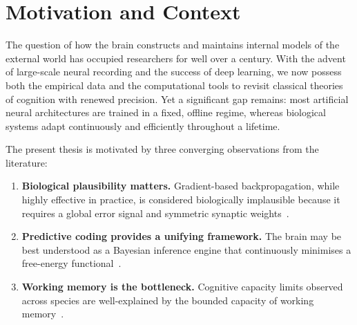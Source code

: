 \section{Motivation and Context}

The question of how the brain constructs and maintains internal models of the external
world has occupied researchers for well over a century.  With the advent of large-scale
neural recording and the success of deep learning, we now possess both the empirical
data and the computational tools to revisit classical theories of cognition with renewed
precision.  Yet a significant gap remains: most artificial neural architectures are
trained in a fixed, offline regime, whereas biological systems adapt continuously and
efficiently throughout a lifetime.

\medskip
The present thesis is motivated by three converging observations from the literature:
\begin{enumerate}
  \item \textbf{Biological plausibility matters.} Gradient-based backpropagation, while
        highly effective in practice, is considered biologically implausible because it
        requires a global error signal and symmetric synaptic weights~\cite{crick1989}.
  \item \textbf{Predictive coding provides a unifying framework.} The brain may be best
        understood as a Bayesian inference engine that continuously minimises a free-energy
        functional~\cite{friston2010}.
  \item \textbf{Working memory is the bottleneck.} Cognitive capacity limits observed
        across species are well-explained by the bounded capacity of working
        memory~\cite{cowan2001}.
\end{enumerate}
